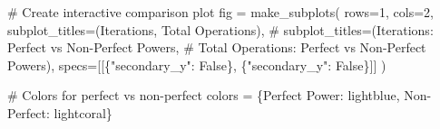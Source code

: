 \documentclass[
  letterpaper,
  DIV=11,
  numbers=noendperiod]{scrartcl}
\newenvironment{Shaded}{\begin{snugshade}}{\end{snugshade}}
\newcommand{\CommentTok}[1]{\textcolor[rgb]{0.37,0.37,0.37}{#1}}
\newcommand{\DecValTok}[1]{\textcolor[rgb]{0.68,0.00,0.00}{#1}}
\newcommand{\NormalTok}[1]{\textcolor[rgb]{0.00,0.23,0.31}{#1}}
\newcommand{\OperatorTok}[1]{\textcolor[rgb]{0.37,0.37,0.37}{#1}}
\newcommand{\StringTok}[1]{\textcolor[rgb]{0.13,0.47,0.30}{#1}}
\newcommand{\VariableTok}[1]{\textcolor[rgb]{0.07,0.07,0.07}{#1}}
\begin{document}
\begin{Shaded}
\begin{Highlighting}[]
\CommentTok{\# Create interactive comparison plot}
\NormalTok{fig }\OperatorTok{=}\NormalTok{ make\_subplots(}
\NormalTok{    rows}\OperatorTok{=}\DecValTok{1}\NormalTok{, cols}\OperatorTok{=}\DecValTok{2}\NormalTok{,}
\NormalTok{    subplot\_titles}\OperatorTok{=}\NormalTok{(}\StringTok{\textquotesingle{}Iterations\textquotesingle{}}\NormalTok{, }
                   \StringTok{\textquotesingle{}Total Operations\textquotesingle{}}\NormalTok{),}
    \CommentTok{\# subplot\_titles=(\textquotesingle{}Iterations: Perfect vs Non{-}Perfect Powers\textquotesingle{}, }
    \CommentTok{\#                \textquotesingle{}Total Operations: Perfect vs Non{-}Perfect Powers\textquotesingle{}),}
\NormalTok{    specs}\OperatorTok{=}\NormalTok{[[\{}\StringTok{"secondary\_y"}\NormalTok{: }\VariableTok{False}\NormalTok{\}, \{}\StringTok{"secondary\_y"}\NormalTok{: }\VariableTok{False}\NormalTok{\}]]}
\NormalTok{)}

\CommentTok{\# Colors for perfect vs non{-}perfect}
\NormalTok{colors }\OperatorTok{=}\NormalTok{ \{}\StringTok{\textquotesingle{}Perfect Power\textquotesingle{}}\NormalTok{: }\StringTok{\textquotesingle{}lightblue\textquotesingle{}}\NormalTok{, }\StringTok{\textquotesingle{}Non{-}Perfect\textquotesingle{}}\NormalTok{: }\StringTok{\textquotesingle{}lightcoral\textquotesingle{}}\NormalTok{\}}


\end{Highlighting}
\end{Shaded}
\end{document}
